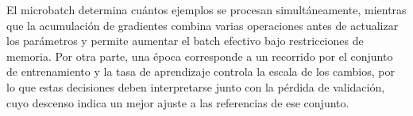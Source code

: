 El microbatch determina cuántos ejemplos se procesan simultáneamente, mientras que la acumulación de gradientes combina varias operaciones antes de actualizar los parámetros y permite aumentar el batch efectivo bajo restricciones de memoria. Por otra parte, una época corresponde a un recorrido por el conjunto de entrenamiento y la tasa de aprendizaje controla la escala de los cambios, por lo que estas decisiones deben interpretarse junto con la pérdida de validación, cuyo descenso indica un mejor ajuste a las referencias de ese conjunto.

